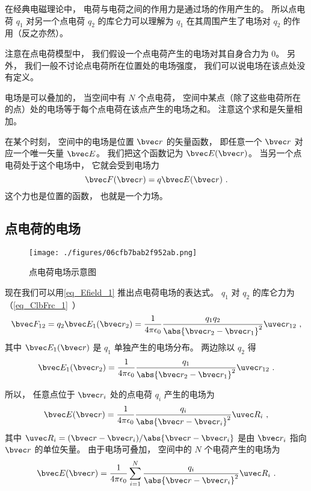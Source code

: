 
在经典电磁理论中， 电荷与电荷之间的作用力是通过场的作用产生的。 所以点电荷 $q_1$ 对另一个点电荷 $q_2$ 的库仑力可以理解为 $q_1$ 在其周围产生了电场对 $q_2$ 的作用（反之亦然）。

注意在点电荷模型中， 我们假设一个点电荷产生的电场对其自身合力为 0。 另外， 我们一般不讨论点电荷所在位置处的电场强度， 我们可以说电场在该点处没有定义。

电场是可以叠加的， 当空间中有 $N$ 个点电荷， 空间中某点（除了这些电荷所在的点）处的电场等于每个点电荷在该点产生的电场之和。 注意这个求和是矢量相加。

在某个时刻， 空间中的电场是位置 $\bvec r$ 的矢量函数， 即任意一个 $\bvec r$ 对应一个唯一矢量 $\bvec E$。 我们把这个函数记为 $\bvec E(\bvec r)$。 当另一个点电荷处于这个电场中， 它就会受到电场力
\begin{equation}\label{eq_Efield_1}
\bvec F(\bvec r) = q \bvec E(\bvec r)~.
\end{equation}
这个力也是位置的函数， 也就是一个力场。
 
\subsection{点电荷的电场}
\begin{figure}[ht]
\centering
\texttt{[image: ./figures/06cfb7bab2f952ab.png]}
\caption{点电荷电场示意图} \label{fig_Efield_4}
\end{figure}
现在我们可以用\autoref{eq_Efield_1} 推出点电荷电场的表达式。 $q_1$ 对 $q_2$ 的库仑力为（\autoref{eq_ClbFrc_1}~）
\begin{equation}\label{eq_Efield_3}
\bvec F_{12} = q_2 \bvec E_1(\bvec r_2) = \frac{1}{4\pi\epsilon_0}\frac{q_1 q_2}{\abs{\bvec r_2 - \bvec r_1}^2} \uvec r_{12}~,
\end{equation}
其中 $\bvec E_1(\bvec r)$ 是 $q_1$ 单独产生的电场分布。 两边除以 $q_2$ 得
\begin{equation}
\bvec E_1(\bvec r_2) = \frac{1}{4\pi\epsilon_0}\frac{q_1}{\abs{\bvec r_2 - \bvec r_1}^2} \uvec r_{12}~.
\end{equation}

所以， 任意点位于 $\bvec r_i$ 处的点电荷 $q_i$ 产生的电场为
\begin{equation}\label{eq_Efield_4}
\bvec E(\bvec r) = \frac{1}{4\pi\epsilon_0}\frac{q_i}{\abs{\bvec r - \bvec r_i}^2} \uvec R_i~,
\end{equation}
其中 $\uvec R_i = (\bvec r - \bvec r_i) / \abs{\bvec r - \bvec r_i}$ 是由 $\bvec r_i$ 指向 $\bvec r$ 的单位矢量。 由于电场可叠加， 空间中的 $N$ 个电荷产生的电场为
\begin{equation}\label{eq_Efield_2}
\bvec E(\bvec r) = \frac{1}{4\pi\epsilon_0} \sum_{i=1}^N \frac{q_i}{\abs{\bvec r - \bvec r_i}^2} \uvec R_i~.
\end{equation}

